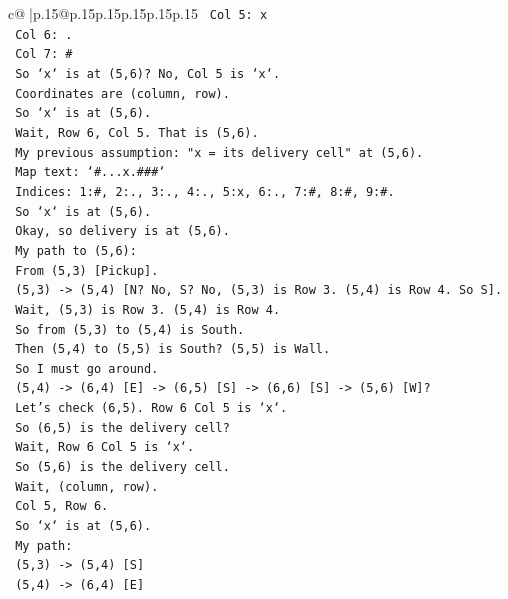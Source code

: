 \documentclass{article}
\begin{document}
{\begin{supertabular}{c@{$\;$}|p{.15\linewidth}@{}p{.15\linewidth}p{.15\linewidth}p{.15\linewidth}p{.15\linewidth}p{.15\linewidth}}
{{{\texttt{    Col 5: x} \\
\texttt{    Col 6: .} \\
\texttt{    Col 7: \#} \\
\texttt{    So `x` is at (5,6)? No, Col 5 is `x`.} \\
\texttt{    Coordinates are (column, row).} \\
\texttt{    So `x` is at (5,6).} \\
\texttt{    Wait, Row 6, Col 5. That is (5,6).} \\
\texttt{    My previous assumption: "x = its delivery cell" at (5,6).} \\
\texttt{    Map text: `\#...x.\#\#\#`} \\
\texttt{    Indices: 1:\#, 2:., 3:., 4:., 5:x, 6:., 7:\#, 8:\#, 9:\#.} \\
\texttt{    So `x` is at (5,6).} \\
\texttt{    Okay, so delivery is at (5,6).} \\
\texttt{    My path to (5,6):} \\
\texttt{    From (5,3) {[}Pickup{]}.} \\
\texttt{    (5,3) {-}> (5,4) {[}N? No, S? No, (5,3) is Row 3. (5,4) is Row 4. So S{]}.} \\
\texttt{    Wait, (5,3) is Row 3. (5,4) is Row 4.} \\
\texttt{    So from (5,3) to (5,4) is South.} \\
\texttt{    Then (5,4) to (5,5) is South? (5,5) is Wall.} \\
\texttt{    So I must go around.} \\
\texttt{    (5,4) {-}> (6,4) {[}E{]} {-}> (6,5) {[}S{]} {-}> (6,6) {[}S{]} {-}> (5,6) {[}W{]}?} \\
\texttt{    Let's check (6,5). Row 6 Col 5 is `x`.} \\
\texttt{    So (6,5) is the delivery cell?} \\
\texttt{    Wait, Row 6 Col 5 is `x`.} \\
\texttt{    So (5,6) is the delivery cell.} \\
\texttt{    Wait, (column, row).} \\
\texttt{    Col 5, Row 6.} \\
\texttt{    So `x` is at (5,6).} \\
\texttt{    My path:} \\
\texttt{    (5,3) {-}> (5,4) {[}S{]}} \\
\texttt{    (5,4) {-}> (6,4) {[}E{]}} \\
}}}
\end{supertabular}}
\end{document}
